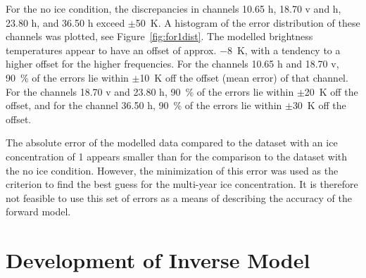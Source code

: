 \documentclass[11pt, a4paper]{article}
\begin{document}
For the no ice condition, the discrepancies in channels 10.65 h, 18.70 v and h, 23.80 h, and 36.50 h exceed \(\pm\)\SI{50}{K}. A histogram of the error distribution of these channels was plotted, see \mbox{Figure \ref{fig:for1dist}}. The modelled brightness temperatures appear to have an offset of approx. \SI{-8}{K}, with a tendency to a higher offset for the higher frequencies. For the channels 10.65 h and 18.70 v, \SI{90}{\percent} of the errors lie within \(\pm\)\SI{10}{K} off the offset (mean error) of that channel. For the channels 18.70 v and 23.80 h, \SI{90}{\percent} of the errors lie within \(\pm\)\SI{20}{K} off the offset, and for the channel 36.50 h, \SI{90}{\percent} of the errors lie within \(\pm\)\SI{30}{K} off the offset.
\newline

The absolute error of the modelled data compared to the dataset with an ice concentration of 1 appears smaller than for the comparison to the dataset with the no ice condition. However, the minimization of this error was used as the criterion to find the best guess for the multi-year ice concentration. It is therefore not feasible to use this set of errors as a means of describing the accuracy of the forward model.




\clearpage
\section{Development of Inverse Model}

\end{document}
